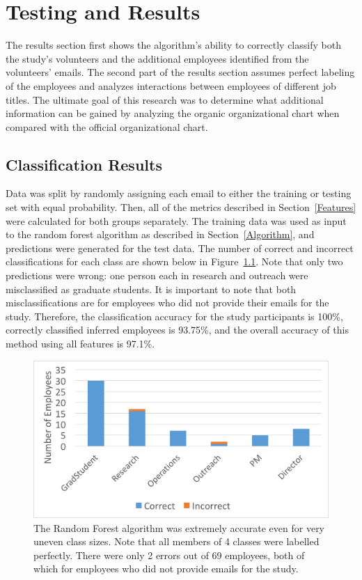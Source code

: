 \documentclass[12pt]{report}
\begin{document}
\chapter{Testing and Results} \label{TestingResults}
The results section first shows the algorithm's ability to correctly classify both the study's volunteers and the additional employees identified from the volunteers' emails.
The second part of the results section assumes perfect labeling of the employees and analyzes interactions between employees of different job titles.
The ultimate goal of this research was to determine what additional information can be gained by analyzing the organic organizational chart when compared with the official organizational chart.

\section{Classification Results}
Data was split by randomly assigning each email to either the training or testing set with equal probability.
Then, all of the metrics described in Section~\ref{Features} were calculated for both groups separately.
The training data was used as input to the random forest algorithm as described in Section~\ref{Algorithm}, and predictions were generated for the test data.
The number of correct and incorrect classifications for each class are shown below in Figure~\ref{fig:result_hist}.
Note that only two predictions were wrong: one person each in research and outreach were misclassified as graduate students.
It is important to note that both  misclassifications are for employees who did not provide their emails for the study.
Therefore, the classification accuracy for the study participants is 100\%, correctly classified inferred employees is 93.75\%, and the overall accuracy of this method using all features is 97.1\%.

\begin{figure}[t]
    \centering
    \includegraphics[width=\columnwidth,trim={1mm 2mm 1mm 3mm},clip]{Prediction_50_50_RF}
    \vspace{-20pt}
    \caption{The Random Forest algorithm was extremely accurate even for very uneven class sizes.  Note that all members of 4 classes were labelled perfectly.  There were only 2 errors out of 69 employees, both of which for employees who did not provide emails for the study.}
    \label{fig:result_hist}
\end{figure}
\end{document}
